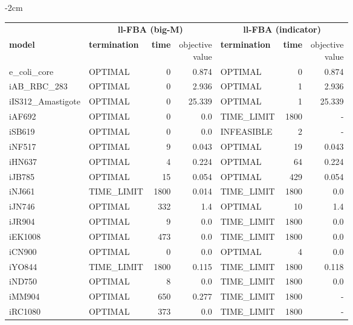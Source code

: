 \begin{table}[!ht]
    \footnotesize
    \centering
    \addtolength{\leftskip} {-2cm}
    \addtolength{\rightskip}{-2cm}
    \begin{tabular}{@{\extracolsep{4pt}}llrrlrr@{}}
    \hline
        \multicolumn{1}{c}{} & \multicolumn{3}{c}{\textbf{ll-FBA (big-M)}} & \multicolumn{3}{c}{\textbf{ll-FBA (indicator)}}\\ \cline{2-4} \cline{5-7} 
        \textbf{model} & \textbf{termination} & \textbf{time} & \thead{objective \\value} & \textbf{termination} & \textbf{time} & \thead{objective \\value} \\ \hline
        e\_coli\_core & OPTIMAL & 0 & 0.874 & OPTIMAL & 0 & 0.874 \\ 
        iAB\_RBC\_283 & OPTIMAL & 0 & 2.936 & OPTIMAL & 1 & 2.936 \\ 
        iIS312\_Amastigote & OPTIMAL & 0 & 25.339 & OPTIMAL & 1 & 25.339 \\ 
        iAF692 & OPTIMAL & 0 & 0.0 & TIME\_LIMIT & 1800 & - \\ 
        iSB619 & OPTIMAL & 0 & 0.0 & INFEASIBLE & 2 & - \\ 
        iNF517 & OPTIMAL & 9 & 0.043 & OPTIMAL & 19 & 0.043 \\ 
        iHN637 & OPTIMAL & 4 & 0.224 & OPTIMAL & 64 & 0.224 \\ 
        iJB785 & OPTIMAL & 15 & 0.054 & OPTIMAL & 429 & 0.054 \\ 
        iNJ661 & TIME\_LIMIT & 1800 & 0.014 & TIME\_LIMIT & 1800 & 0.0 \\ 
        iJN746 & OPTIMAL & 332 & 1.4 & OPTIMAL & 10 & 1.4 \\ 
        iJR904 & OPTIMAL & 9 & 0.0 & TIME\_LIMIT & 1800 & 0.0 \\ 
        iEK1008 & OPTIMAL & 473 & 0.0 & TIME\_LIMIT & 1800 & 0.0 \\ 
        iCN900 & OPTIMAL & 0 & 0.0 & OPTIMAL & 4 & 0.0 \\ 
        iYO844 & TIME\_LIMIT & 1800 & 0.115 & TIME\_LIMIT & 1800 & 0.118 \\ 
        iND750 & OPTIMAL & 8 & 0.0 & TIME\_LIMIT & 1800 & 0.0 \\ 
        iMM904 & OPTIMAL & 650 & 0.277 & TIME\_LIMIT & 1800 & - \\ 
        iRC1080 & OPTIMAL & 373 & 0.0 & TIME\_LIMIT & 1800 & - \\ 

\end{tabular}
\end{table}
